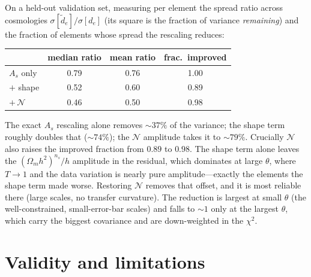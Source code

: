 \documentclass[11pt]{article}
\newcommand{\Om}{\Omega_m}
\newcommand{\ns}{n_s}
\begin{document}
On a held-out validation set, measuring per element the spread ratio
across cosmologies $\sigma[\tilde d_e]/\sigma[d_e]$ (its square is
the fraction of variance \emph{remaining}) and the fraction of
elements whose spread the rescaling reduces:

\begin{center}
\begin{tabular}{lccc}
\hline
 & median ratio & mean ratio & frac.\ improved \\
\hline
$A_s$ only        & 0.79 & 0.76 & 1.00 \\
$+$ shape         & 0.52 & 0.60 & 0.89 \\
$+\,\mathcal{N}$  & 0.46 & 0.50 & 0.98 \\
\hline
\end{tabular}
\end{center}

\noindent The exact $A_s$ rescaling alone removes ${\sim}37\%$ of the
variance; the shape term roughly doubles that (${\sim}74\%$); the
$\mathcal{N}$ amplitude takes it to ${\sim}79\%$. Crucially
$\mathcal{N}$ also raises the improved fraction from $0.89$ to
$0.98$. The shape term alone leaves the $(\Om h^2)^{\ns}/h$ amplitude
in the residual, which dominates at large $\theta$, where $T\to1$
and the data variation is nearly pure amplitude---exactly the
elements the shape term made worse. Restoring $\mathcal{N}$ removes
that offset, and it is most reliable there (large scales, no
transfer curvature). The reduction is largest at small $\theta$ (the
well-constrained, small-error-bar scales) and falls to ${\sim}1$
only at the largest $\theta$, which carry the biggest covariance and
are down-weighted in the $\chi^2$.

\section{Validity and limitations}
\end{document}
